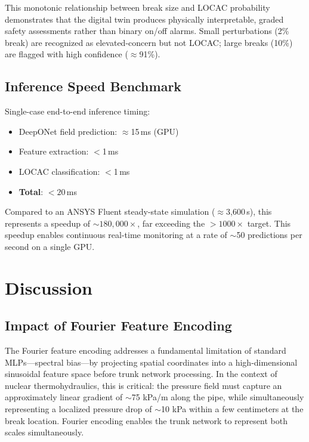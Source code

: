 \documentclass[conference]{IEEEtran}
\begin{document}
This monotonic relationship between break size and LOCAC probability demonstrates that the digital twin produces physically interpretable, graded safety assessments rather than binary on/off alarms. Small perturbations (2\% break) are recognized as elevated-concern but not LOCAC; large breaks (10\%) are flagged with high confidence ($\approx$91\%).

\subsection{Inference Speed Benchmark}

Single-case end-to-end inference timing:
\begin{itemize}
    \item DeepONet field prediction: $\approx$15\,ms (GPU)
    \item Feature extraction: $<$1\,ms
    \item LOCAC classification: $<$1\,ms
    \item \textbf{Total}: $<20$\,ms
\end{itemize}

Compared to an ANSYS Fluent steady-state simulation ($\approx$3,600\,s), this represents a speedup of $\sim$$180,000\times$, far exceeding the $>1000\times$ target. This speedup enables continuous real-time monitoring at a rate of $\sim$50 predictions per second on a single GPU.

\section{Discussion}
\label{sec:discussion}

\subsection{Impact of Fourier Feature Encoding}

The Fourier feature encoding addresses a fundamental limitation of standard MLPs—spectral bias—by projecting spatial coordinates into a high-dimensional sinusoidal feature space before trunk network processing. In the context of nuclear thermohydraulics, this is critical: the pressure field must capture an approximately linear gradient of $\sim$75 kPa/m along the pipe, while simultaneously representing a localized pressure drop of $\sim$10 kPa within a few centimeters at the break location. Fourier encoding enables the trunk network to represent both scales simultaneously.
\end{document}
